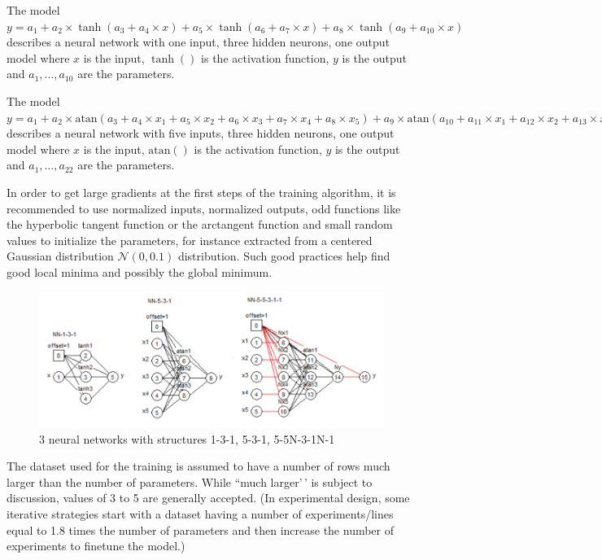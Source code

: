 The model
\(y = a_1 + a_2\times \tanh(a_3 + a_4\times x) + a_5\times \tanh(a_6 + a_7\times x) + a_8\times \tanh(a_9 + a_{10}\times x)\)
describes a neural network with one input, three hidden neurons, one
output model where \(x\) is the input, \(\tanh()\) is the activation
function, \(y\) is the output and \(a_1,\dots,a_{10}\) are the
parameters.

The model
\(y = a_1 + a_2\times \text{atan}(a_3 + a_4\times x_1 + a_5\times x_2 + a_6\times x_3 + a_7\times x_4 + a_8\times x_5) + a_9\times \text{atan}(a_{10} + a_{11}\times x_1 + a_{12}\times x_2 + a_{13}\times x_3 + a_{14}\times x_4 + a_{15}\times x_5) + a_{16}\text{atan}(a_{17} + a_{18}\times x_1 + a_{19}\times x_2 + a_{20}\times x_3 + a_{21}\times x_4 + a_{22}\times x_5)\)
describes a neural network with five inputs, three hidden neurons, one
output model where \(x\) is the input, \(\text{atan}()\) is the
activation function, \(y\) is the output and \(a_1,\dots,a_{22}\) are
the parameters.

In order to get large gradients at the first steps of the training
algorithm, it is recommended to use normalized inputs, normalized
outputs, odd functions like the hyperbolic tangent function or the
arctangent function and small random values to initialize the
parameters, for instance extracted from a centered Gaussian distribution
\(\mathcal N(0, 0.1)\) distribution. Such good practices help find good
local minima and possibly the global minimum.

\begin{figure}
\centering
\includegraphics{RN3.png}
\caption{3 neural networks with structures 1-3-1, 5-3-1, 5-5N-3-1N-1}
\end{figure}

The dataset used for the training is assumed to have a number of rows
much larger than the number of parameters. While ``much larger'\,' is
subject to discussion, values of 3 to 5 are generally accepted. (In
experimental design, some iterative strategies start with a dataset
having a number of experiments/lines equal to 1.8 times the number of
parameters and then increase the number of experiments to finetune the
model.)

